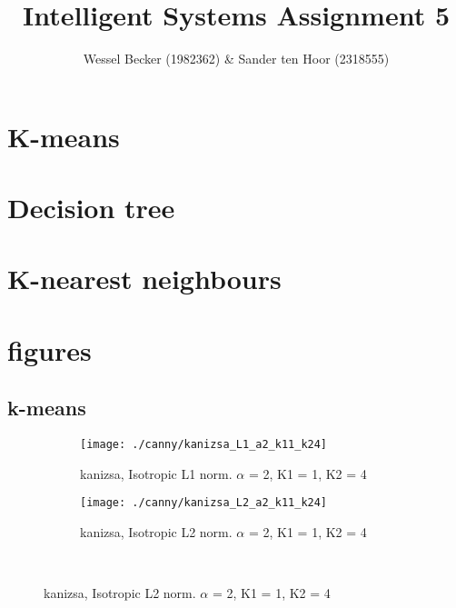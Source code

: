 \documentclass[10pt,a4paper]{article}
\begin{document}
\title{Intelligent Systems Assignment 5}
\author{Wessel Becker (1982362) \& Sander ten Hoor (2318555)}
\maketitle

\newcommand{\simplefigure}[3]{
	\begin{figure}[H]
  	\centering
    	\makebox[\textwidth]
    	{
    		\texttt{[image: \#1]}
 		} \\
  		\caption{#2}
  		\label{#3}
	\end{figure}
}
\newcommand{\mcode}[1]{
	
}

\section{K-means}
\section{Decision tree}
\section{K-nearest neighbours}

\appendix
\section{figures}

\subsection{k-means}\begin{figure}[H]
\centering

  \begin{subfigure}{.7\textwidth}
    \centering
    \texttt{[image: ./canny/kanizsa\_L1\_a2\_k11\_k24]}
    \caption{kanizsa, Isotropic L1 norm. $\alpha$ = 2, K1 = 1, K2 = 4}
    \label{fig:kanizsa_L1_a2_k11_k24}
  \end{subfigure}%
  
  \begin{subfigure}{.7\textwidth}
    \centering
    \texttt{[image: ./canny/kanizsa\_L2\_a2\_k11\_k24]}
    \caption{kanizsa, Isotropic L2 norm. $\alpha$ = 2, K1 = 1, K2 = 4}
    \label{fig:kanizsa_L2_a2_k11_k24}
  \end{subfigure}\\%
 \end{figure}
\end{document}
